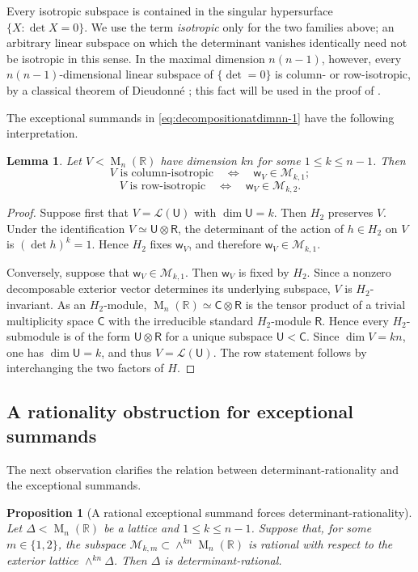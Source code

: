 \documentclass[reqno,11pt]{amsart}
\numberwithin{equation}{section}
\newtheorem{lemma}[theorem]{Lemma}
\newtheorem{proposition}[theorem]{Proposition}
\theoremstyle{definition}
\theoremstyle{remark}
\newcommand{\op}{\operatorname}
\newcommand{\M}{\op{M}}
\begin{document}
Every isotropic subspace is contained in the singular hypersurface
$\{X:\det X=0\}$. We use the term \emph{isotropic} only for the two
families above; an arbitrary linear subspace on which the determinant
vanishes identically need not be isotropic in this sense. In the maximal
dimension $n(n-1)$, however, every $n(n-1)$-dimensional linear subspace of $\{\det=0\}$ is
column- or row-isotropic, by a classical theorem of Dieudonn\'e
\cite{dieudonne:1948}; this fact will be used in the proof of
.

The exceptional summands in \eqref{eq:decompositionatdimnn-1} have the
following interpretation.

\begin{lemma}\label{lem:isotropic_iff_pi1_pi2}
Let $V<\M_n(\mathbb R)$ have dimension $kn$ for some $1\le k\le n-1$. Then
$$
V\text{ is column-isotropic}
\quad\Longleftrightarrow\quad
\mathsf w_V\in\mathcal M_{k,1};
$$
$$
V\text{ is row-isotropic}
\quad\Longleftrightarrow\quad
\mathsf w_V\in\mathcal M_{k,2}.
$$
\end{lemma}

\begin{proof}
Suppose first that $V=\mathcal L(\mathsf U)$ with $\dim \mathsf U=k$. Then $H_2$ preserves $V$. Under the
identification $V\simeq \mathsf U\otimes\mathsf R$, the determinant of the action
of $h\in H_2$ on $V$ is $(\det h)^k=1$. Hence $H_2$ fixes
$\mathsf w_V$, and therefore $\mathsf w_V\in\mathcal M_{k,1}$.

Conversely, suppose that $\mathsf w_V\in\mathcal M_{k,1}$. Then
$\mathsf w_V$ is fixed by $H_2$. Since a nonzero decomposable exterior
vector determines its underlying subspace, $V$ is $H_2$-invariant. As an
$H_2$-module,
$
\M_n(\mathbb R)\simeq\mathsf C\otimes\mathsf R
$
is the tensor product of a trivial multiplicity space $\mathsf C$ with the
irreducible standard $H_2$-module $\mathsf R$. Hence every
$H_2$-submodule is of the form $\mathsf U\otimes\mathsf R$ for a unique
subspace $\mathsf U<\mathsf C$. Since $\dim V=kn$, one has $\dim \mathsf U=k$, and
thus $V=\mathcal L(\mathsf U)$. The row statement follows by interchanging the
two factors of $H$.
\end{proof}

\subsection{A rationality obstruction for exceptional summands}

The next observation clarifies the relation between determinant-rationality
and the exceptional summands. 
\begin{proposition}[A rational exceptional summand forces determinant-rationality]
\label{prop:rational-exceptional-summand-implies-det-rational}
Let $\Delta<\M_n(\mathbb R)$ be a lattice and
$1\le k\le n-1$. Suppose that, for some $m\in\{1,2\}$, the subspace
$\mathcal M_{k,m}\subset\wedge^{kn}\M_n(\mathbb R)$ is rational with
respect to the exterior lattice $\wedge^{kn}\Delta$. Then $\Delta$ is
determinant-rational.
\end{proposition}
\end{document}
